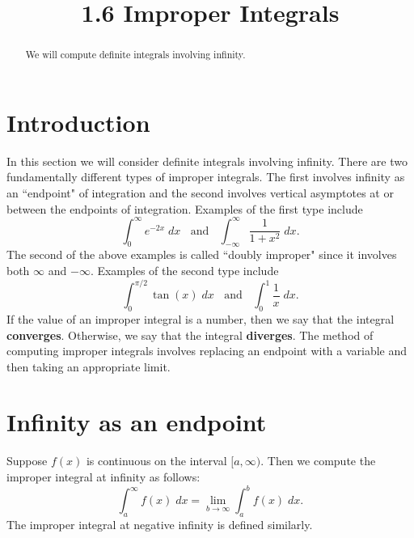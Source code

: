 \documentclass[handout]{ximera}
\title{1.6 Improper Integrals}
\begin{document}
\begin{abstract}
We will compute definite integrals involving infinity.
\end{abstract}

\maketitle

\section{Introduction}
In this section we will consider definite integrals involving infinity.
There are two fundamentally different types of improper integrals.  The first involves infinity as an ``endpoint"
of integration and the second involves vertical asymptotes at or between the endpoints of integration.
Examples of the first type include
\[
\int_0^\infty e^{-2x} \; dx \; \; \text{ and } \;  \; \int_{-\infty}^\infty \frac{1}{1+x^2}\; dx.
\]
The second of the above examples is called ``doubly improper" since it involves both $\infty$ and $-\infty$.
Examples of the second type include
\[
\int_0^{\pi/2} \tan(x)\; dx \; \; \text{ and } \; \; \int_0^1 \frac{1}{x} \; dx.
\]
If the value of an improper integral is a number, then we say that the integral \textbf{converges}.
Otherwise, we say that the integral \textbf{diverges}.
The method of computing improper integrals involves replacing an endpoint with a variable 
and then taking an appropriate limit.




\section{Infinity as an endpoint}
\begin{definition}
Suppose $f(x)$ is continuous on the interval $[a, \infty)$. Then we compute the improper integral at infinity as follows:
\[
\int_a^\infty f(x) \; dx = \lim_{b \to \infty} \int_a^b f(x) \; dx.
\]
The improper integral at negative infinity is defined similarly.
\end{definition}
\end{document}
